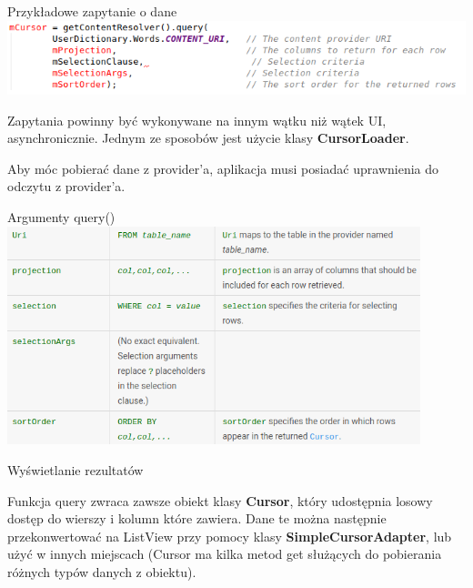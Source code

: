 \documentclass{beamer}
\begin{document}
\begin{frame}{Przykładowe zapytanie o dane}
	\includegraphics[width=\textwidth]{query}
	\begin{block}{}
		Zapytania powinny być wykonywane na innym wątku niż wątek UI, asynchronicznie. Jednym ze sposobów jest użycie klasy \textbf{CursorLoader}.
	\end{block}
	\begin{block}{}
		Aby móc pobierać dane z provider'a, aplikacja musi posiadać uprawnienia do odczytu z provider'a.
	\end{block}
\end{frame}

\begin{frame}{Argumenty query()}
	\centering
	\includegraphics[width=0.9\textwidth]{query-args}
\end{frame}

\begin{frame}{Wyświetlanie rezultatów}
	\begin{block}{}
		Funkcja query zwraca zawsze obiekt klasy \textbf{Cursor}, który udostępnia losowy dostęp do wierszy i kolumn które zawiera. Dane te można następnie przekonwertować na ListView przy pomocy klasy \textbf{SimpleCursorAdapter}, lub użyć w innych miejscach (Cursor ma kilka metod get służących do pobierania różnych typów danych z obiektu).
	\end{block}
\end{frame}
\end{document}
